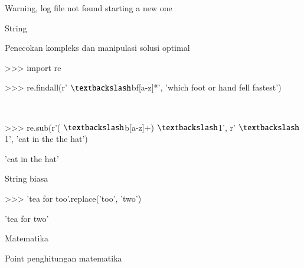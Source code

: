 \noindent 
{\fontsize{14pt}{14pt}\selectfont Warning, log file not found starting a new one \\} \par
\vspace{14pt}
\noindent 
{\fontsize{14pt}{14pt}\selectfont String \\} \par
\noindent 
{\fontsize{14pt}{14pt}\selectfont Penccokan kompleks dan manipulasi solusi optimal \\} \par
\vspace{14pt}
\noindent 
{\fontsize{14pt}{14pt}\selectfont >>> import re \\} \par
\vspace{14pt}
\noindent 
{\fontsize{14pt}{14pt}\selectfont >>> re.findall(r' $  \textbackslash  $bf[a-z]*', 'which foot or hand fell fastest') \\} \par
\noindent 
{\fontsize{14pt}{14pt} \\} \par
\vspace{14pt}
\noindent 
{\fontsize{14pt}{14pt}\selectfont >>> re.sub(r'( $  \textbackslash  $b[a-z]+)  $  \textbackslash  $1', r' $  \textbackslash  $1', 'cat in the the hat') \\} \par
\noindent 
{\fontsize{14pt}{14pt}\selectfont 'cat in the hat' \\} \par
\vspace{14pt}
\noindent 
{\fontsize{14pt}{14pt}\selectfont String biasa \\} \par
\noindent 
{\fontsize{14pt}{14pt}\selectfont >>> 'tea for too'.replace('too', 'two') \\} \par
\noindent 
{\fontsize{14pt}{14pt}\selectfont 'tea for two' \\} \par
\vspace{14pt}
\noindent 
{\fontsize{14pt}{14pt}\selectfont Matematika  \\} \par
\noindent 
{\fontsize{14pt}{14pt}\selectfont Point penghitungan matematika \\} \par
\vspace{14pt}
\noindent 
